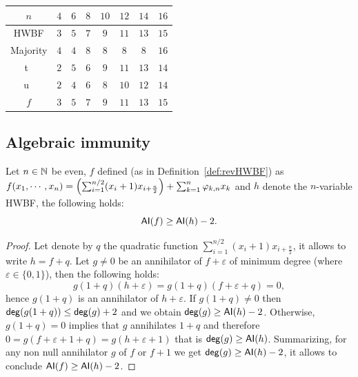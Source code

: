 \documentclass[11pt]{llncs}
\begin{document}
\begin{table}[h]
	\centering
	\begin{tabular}{|c| c|c|c|c| c|c|c|}
		\hline
		$n$ & $4$  & $6$  & $8$  &  $10$ & $12$ & $14$ & $16$  \\
		\hline	
		HWBF   & $3$  & $5$  & $7$  &  $9$ & $11$ & $13$ & $15$  \\  	
		\hline
		Majority   & $4$  & $4$  & $8$  &  $8$ & $8$ & $8$ & $16$  \\
		\hline
		t~\cite{DAM:MeaOza24}   & $2$  & $5$  & $6$  &  $9$ & $11$ & $13$ & $14$\\
		\hline	
		u~\cite{DAM:MeaOza24}   & $2$  & $4$  & $6$  &  $8$ & $10$ & $12$ & $14$ \\
		\hline				
		
		$f$  & $3$  & $5$  & $7$  &  $9$ & $11$ & $13$ & $15$\\
		\hline
	\end{tabular}
	\label{table:comparisonsDeg}
\end{table}



\subsection{Algebraic immunity}

\begin{proposition}
	Let $n\in \mathbb{N}$ be even, $f$ defined (as in Definition~\ref{def:revHWBF}) as
	$f(x_1,\cdots,x_n)=\left(\sum_{i=1}^{n/2} (x_i+1) x_{i+\frac{n}{2}}\right) + \sum_{k=1}^n \varphi_{k,n} x_k$ and $h$ denote the $n$-variable HWBF, the following holds:
	\[\mathsf{AI}(f)\ge \mathsf{AI}(h)-2.\]
\end{proposition}
\begin{proof}
	Let denote by $q$ the quadratic function $\sum_{i=1}^{n/2} (x_i+1) x_{i+\frac{n}{2}}$, it allows to write $h=f+q$. 
	Let $g\neq 0$ be an annihilator of $f+ \varepsilon$ of minimum degree (where $\varepsilon \in \{0,1\}$), then the following holds:
	\[g (1+q) (h+\varepsilon) = g(1+q) (f+\varepsilon + q)=0, \]
	hence $g (1+q)$ is an annihilator of $h+ \varepsilon$. 
	If $g (1+q)\ne 0$ then $\mathsf{deg}(g(1+q)) \le \mathsf{deg}(g)+2$ and we obtain $\mathsf{deg}(g)\ge \mathsf{AI}(h) -2$. 
	Otherwise, $g (1+q)= 0$ implies that $g$ annihilates $1+q$ and therefore $0=g (f+\varepsilon + 1 +q)=g(h+ \varepsilon +1)$ that is $\mathsf{deg}(g)\ge \mathsf{AI}(h)$. 
	Summarizing, for any non null annihilator $g$ of $f$ or $f+1$ we get $\mathsf{deg}(g)\ge \mathsf{AI}(h)-2$, it allows to conclude $\mathsf{AI}(f)\ge \mathsf{AI}(h)-2$.
\end{proof}
\end{document}
